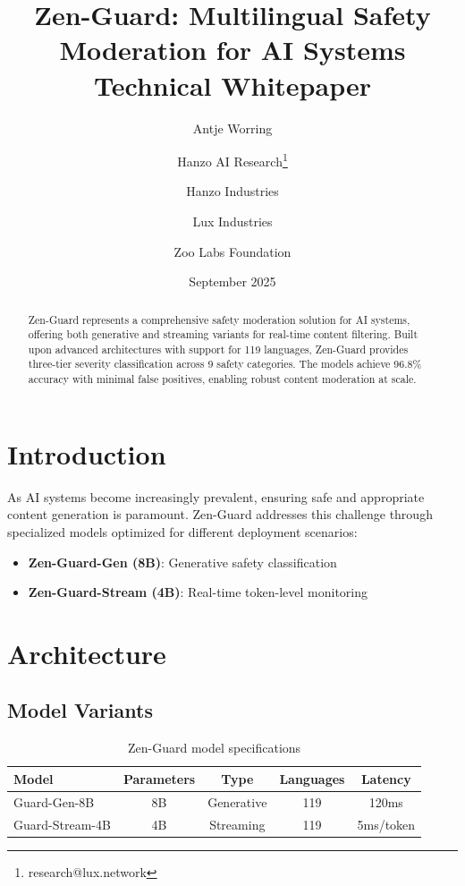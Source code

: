 \documentclass[11pt]{article}
\title{Zen-Guard: Multilingual Safety Moderation for AI Systems\\
\large Technical Whitepaper}
\author{Antje Worring \and Hanzo AI Research\thanks{research@lux.network} \and Hanzo Industries \and Lux Industries \and Zoo Labs Foundation}
\date{September 2025}
\begin{document}
\maketitle

\begin{abstract}
Zen-Guard represents a comprehensive safety moderation solution for AI systems, offering both generative and streaming variants for real-time content filtering. Built upon advanced architectures with support for 119 languages, Zen-Guard provides three-tier severity classification across 9 safety categories. The models achieve 96.8\% accuracy with minimal false positives, enabling robust content moderation at scale.
\end{abstract}

\section{Introduction}

As AI systems become increasingly prevalent, ensuring safe and appropriate content generation is paramount. Zen-Guard addresses this challenge through specialized models optimized for different deployment scenarios:

\begin{itemize}
\item \textbf{Zen-Guard-Gen (8B)}: Generative safety classification
\item \textbf{Zen-Guard-Stream (4B)}: Real-time token-level monitoring
\end{itemize}

\section{Architecture}

\subsection{Model Variants}

\begin{table}[h]
\centering
\begin{tabular}{lcccc}
\toprule
Model & Parameters & Type & Languages & Latency \\
\midrule
Guard-Gen-8B & 8B & Generative & 119 & 120ms \\
Guard-Stream-4B & 4B & Streaming & 119 & 5ms/token \\
\bottomrule
\end{tabular}
\caption{Zen-Guard model specifications}
\end{table}
\end{document}
